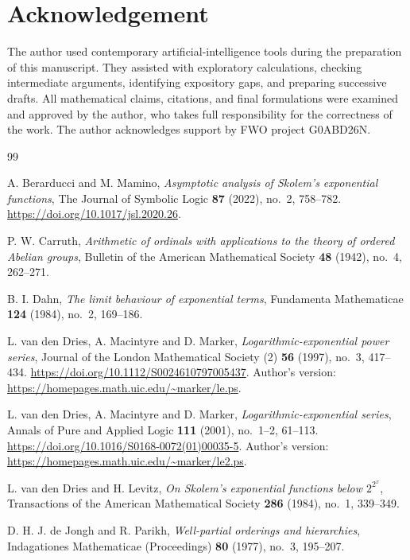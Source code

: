 \documentclass[11pt]{article}
\theoremstyle{definition}
\theoremstyle{remark}
\numberwithin{equation}{section}
\begin{document}
\section*{Acknowledgement}
The author used contemporary artificial-intelligence tools 
during the preparation of this manuscript. They assisted with exploratory
calculations, checking intermediate arguments, identifying expository
gaps, and preparing successive drafts. All mathematical claims,
citations, and final formulations were examined and approved by the
author, who takes full responsibility for the correctness of the work.
The author acknowledges support by FWO project G0ABD26N.


\begin{thebibliography}{99}
\raggedright
{} A. Berarducci and M. Mamino,
\emph{Asymptotic analysis of Skolem's exponential functions},
The Journal of Symbolic Logic \textbf{87} (2022), no.~2, 758--782.
\url{https://doi.org/10.1017/jsl.2020.26}.


 P. W. Carruth,
\emph{Arithmetic of ordinals with applications to the theory of ordered
Abelian groups},
Bulletin of the American Mathematical Society \textbf{48} (1942),
no.~4, 262--271.

 B. I. Dahn,
\emph{The limit behaviour of exponential terms},
Fundamenta Mathematicae \textbf{124} (1984), no.~2, 169--186.

L. van den Dries, A. Macintyre and D. Marker,
\emph{Logarithmic-exponential power series},
Journal of the London Mathematical Society (2) \textbf{56} (1997),
no.~3, 417--434.
\url{https://doi.org/10.1112/S0024610797005437}.
Author's version: \url{https://homepages.math.uic.edu/~marker/le.ps}.

L. van den Dries, A. Macintyre and D. Marker,
\emph{Logarithmic-exponential series},
Annals of Pure and Applied Logic \textbf{111} (2001), no.~1--2,
61--113.
\url{https://doi.org/10.1016/S0168-0072(01)00035-5}.
Author's version: \url{https://homepages.math.uic.edu/~marker/le2.ps}.

 L. van den Dries and H. Levitz,
\emph{On Skolem's exponential functions below $2^{2^x}$},
Transactions of the American Mathematical Society \textbf{286} (1984),
no.~1, 339--349.

 D. H. J. de Jongh and R. Parikh,
\emph{Well-partial orderings and hierarchies},
Indagationes Mathematicae (Proceedings) \textbf{80} (1977),
no.~3, 195--207.


\end{thebibliography}
\end{document}
